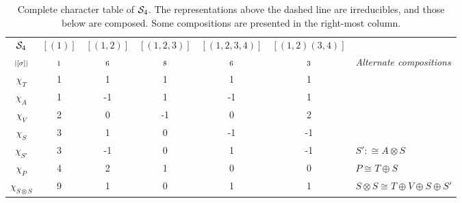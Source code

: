 \begin{example}
	\begin{table}[hbt!]
		\centering
		\begin{tabular}{c | c c c c c | l}
			$\mathcal{S}_4$         & $[(1)]$   & $[(1,2)]$  & $[(1,2,3)]$ & $[(1,2,3,4)]$ & $[(1,2)(3,4)]$ &                                                              \\
			$\scriptstyle|[\sigma]|$    & $\scriptstyle 1$ & $\scriptstyle 6$ & $\scriptstyle 8$ & $\scriptstyle 6$  & $\scriptstyle 3$      & \textit{Alternate compositions}                              \\ \hline
			$\chi_T$       & 1       & 1       & 1       & 1        & 1            &                                                              \\
			$\chi_A$       & 1       & -1      & 1       & -1       & 1            &                                                              \\
			$\chi_V$       & 2       & 0       & -1      & 0        & 2            &                                                              \\
			$\chi_S$       & 3       & 1       & 0       & -1       & -1           &                                                              \\
			$\chi_{S'}$ & 3       & -1      & 0       & 1        & -1           & $S' :\cong A \otimes S$                                  \\ \hline\hline
			$\chi_P$       & 4       & 2       & 1       & 0        & 0            & $P \cong T \oplus S$                                         \\
			$\chi_{S \otimes S}$ & 9       & 1       & 0       & 1        & 1            & $S \otimes S \cong T \oplus V \oplus S \oplus S'$ \\
		\end{tabular}
		\caption{Complete character table of $\mathcal{S}_4$. The representations above the dashed line are irreducibles, and those below are composed. Some compositions are presented in the right-most column.}
		\label{table:completecharS4}
	\end{table}
\end{example}


